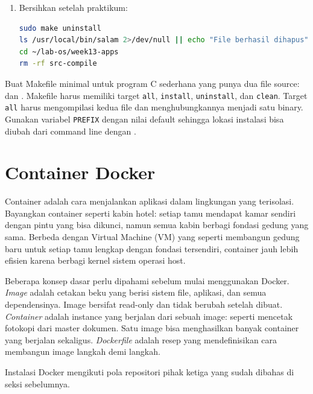 \begin{enumerate}
    \item Bersihkan setelah praktikum:
\begin{lstlisting}[language=bash, caption={Uninstall dan bersihkan direktori}]
sudo make uninstall
ls /usr/local/bin/salam 2>/dev/null || echo "File berhasil dihapus"
cd ~/lab-os/week13-apps
rm -rf src-compile
\end{lstlisting}
\end{enumerate}

\begin{challengebox}
Buat Makefile minimal untuk program C sederhana yang punya dua file source:
 dan . Makefile harus memiliki target \texttt{all},
\texttt{install}, \texttt{uninstall}, dan \texttt{clean}. Target \texttt{all}
harus mengompilasi kedua file dan menghubungkannya menjadi satu binary.
Gunakan variabel \texttt{PREFIX} dengan nilai default  sehingga
lokasi instalasi bisa diubah dari command line dengan .
\end{challengebox}

\section{Container Docker}
\label{sec:docker-containers}

Container adalah cara menjalankan aplikasi dalam lingkungan yang terisolasi.
Bayangkan container seperti kabin hotel: setiap tamu mendapat kamar sendiri
dengan pintu yang bisa dikunci, namun semua kabin berbagi fondasi gedung yang
sama. Berbeda dengan Virtual Machine (VM) yang seperti membangun gedung baru
untuk setiap tamu lengkap dengan fondasi tersendiri, container jauh lebih
efisien karena berbagi kernel sistem operasi host.

Beberapa konsep dasar perlu dipahami sebelum mulai menggunakan Docker.
\emph{Image} adalah cetakan beku yang berisi sistem file, aplikasi, dan semua
dependensinya. Image bersifat read-only dan tidak berubah setelah dibuat.
\emph{Container} adalah instance yang berjalan dari sebuah image: seperti
mencetak fotokopi dari master dokumen. Satu image bisa menghasilkan banyak
container yang berjalan sekaligus. \emph{Dockerfile} adalah resep yang
mendefinisikan cara membangun image langkah demi langkah.

Instalasi Docker mengikuti pola repositori pihak ketiga yang sudah dibahas di
seksi sebelumnya.

